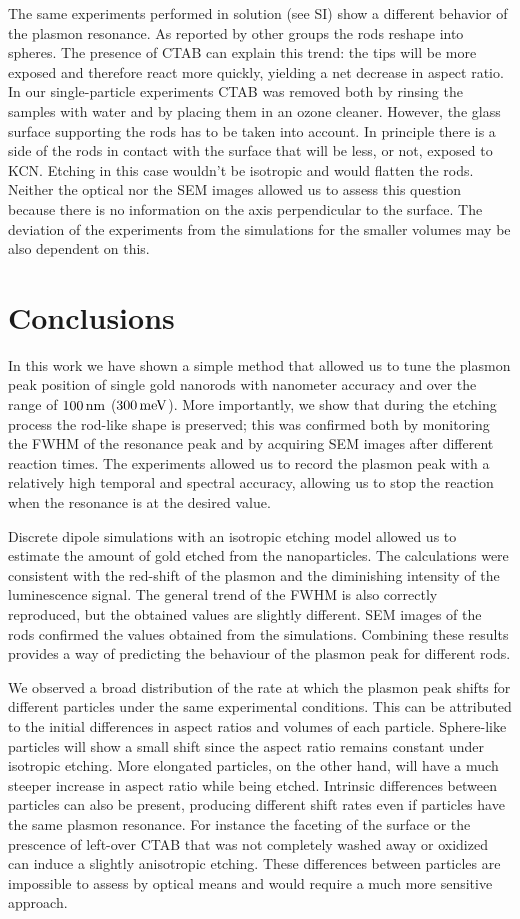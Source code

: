 The same experiments performed in solution (see SI) show a different behavior of
the plasmon resonance. As reported by other groups \cite{Jana2002,Yuan2015} the
rods reshape into spheres. The presence of CTAB can explain this trend: the tips
will be more exposed and therefore react more quickly, yielding a net decrease
in aspect ratio. In our single-particle experiments CTAB was removed both by
rinsing the samples with water and by placing them in an ozone cleaner. However,
the glass surface supporting the rods has to be taken into account. In principle
there is a side of the rods in contact with the surface that will be less, or
not, exposed to KCN. Etching in this case wouldn't be isotropic and would
flatten the rods. Neither the optical nor the SEM images allowed us to assess
this question because there is no information on the axis perpendicular to the
surface. The deviation of the experiments from the simulations for the smaller
volumes may be also dependent on this.

\section{Conclusions}
In this work we have shown a simple method that allowed us to tune the plasmon
peak position of single gold nanorods with nanometer accuracy and over the
range of $100\,\textrm{nm}$ ($300\,\textrm{meV}$). More importantly, we show that during the
etching process the rod-like shape is preserved; this was confirmed both by
monitoring the FWHM of the resonance peak and by acquiring SEM images after
different reaction times. The experiments allowed us to record the plasmon
peak with a relatively high temporal and spectral accuracy, allowing us to
stop the reaction when the resonance is at the desired value.

Discrete dipole simulations with an isotropic etching model allowed us to
estimate the amount of gold etched from the nanoparticles. The calculations
were consistent with the red-shift of the plasmon and the diminishing intensity
of the luminescence signal. The general trend of the FWHM is also correctly
reproduced, but the obtained values are slightly different. SEM images of the
rods confirmed the values obtained from the simulations. Combining these
results provides a way of predicting the behaviour of the plasmon peak for
different rods.

We observed a broad distribution of the rate at which the plasmon peak shifts
for different particles under the same experimental conditions. This can be
attributed to the initial differences in aspect ratios and volumes of each
particle. Sphere-like particles will show a small shift since the aspect ratio
remains constant under isotropic etching. More elongated particles, on the other
hand, will have a much steeper increase in aspect ratio while being etched.
Intrinsic differences between particles can also be present, producing different
shift rates even if particles have the same plasmon resonance. For instance the
faceting of the surface or the prescence of left-over CTAB that was not
completely washed away or oxidized can induce a slightly anisotropic etching.
These differences between particles are impossible to assess by optical means
and would require a much more sensitive approach.


